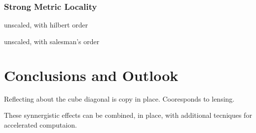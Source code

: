 \documentclass[letterpaper,twocolumn,amsmath,amsfont,amssymb,english,aps,jcp,preprintnumbers,groupaddress,nofootinbib,tightenlines]{revtex4}
\begin{document}
\subsubsection{Strong Metric Locality}

unscaled, with hilbert order

unscaled, with salesman's order

\section{Conclusions and Outlook}

Reflecting about the cube diagonal is copy in place.  Cooresponds to lensing.

These  synnergistic effects can be combined, in place, with additional tecniques for 
accelerated computaion.



\end{document}

